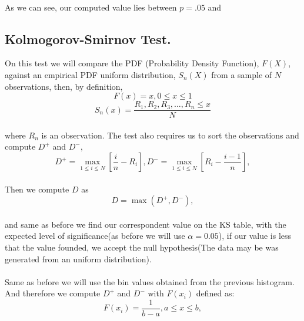 \documentclass{article}
\begin{document}
\paragraph{}As we can see, our computed value lies between $p=.05$ and  
\subsection{Kolmogorov-Smirnov Test.}
On this test we will compare the PDF (Probability Density Function), $F(X)$, against an empirical PDF uniform distribution, $S_n(X)$ from a sample of $N$ observations, then, by definition,
$$F(x) = x, 0 \leq x \leq 1$$
\begin{equation}
S_n(x) = \frac{R_1, R_2, R_3, \dots, R_n \leq x}{N}
\end{equation}
\paragraph{} where $R_n$ is an observation. The test also requires us to sort the observations and compute $D^{+}$ and $D^{-}$,
$$D^{+} = \max_{1 \leq i \leq N} \left[ \frac{i}{n} - R_i \right], D^{-} = \max_{1 \leq i \leq N} \left[ R_i - \frac{i-1}{n}\right],$$
\paragraph{} Then we compute $D$ as
$$D = \max(D^{+}, D^{-}),$$
\paragraph{} and same as before we find our correspondent value on the KS table, with the expected level of significance(as before we will use $\alpha= 0.05$), if our value is less that the value founded, we accept the null hypothesis(The data may be was generated from an uniform distribution).
\paragraph{}Same as before we will use the bin values obtained from the previous histogram. And therefore we compute $D^{+}$ and $D^{-}$ with $F(x_i)$ defined as:
$$F(x_i) = \frac{1}{b-a}, a \leq x \leq b,$$
\end{document}

